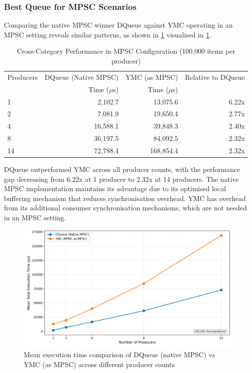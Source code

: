 \subsubsection{Best Queue for \ac{MPSC} Scenarios}
Comparing the native \ac{MPSC} winner DQueue against \ac{YMC} operating in an \ac{MPSC} setting reveals similar patterns, as shown in \cref{tab:best-mpsc} visualised in \cref{fig:cross-mpsc-mean}.

\begin{table}[htb]
\centering
\caption{Cross-Category Performance in \ac{MPSC} Configuration (100,000 items per producer)}
\label{tab:best-mpsc}
\begin{tabular}{@{}lrrr@{}}
\toprule
Producers & DQueue (Native \ac{MPSC}) & \ac{YMC} (as \ac{MPSC}) & Relative to DQueue \\
& Time ($\mu$s) & Time ($\mu$s) & \\
\midrule
1 & 2,102.7 & 13,075.6 & 6.22x \\
2 & 7,081.9 & 19,650.4 & 2.77x \\
4 & 16,588.1 & 39,848.3 & 2.40x \\
8 & 36,197.5 & 84,092.5 & 2.32x \\
14 & 72,788.4 & 168,854.4 & 2.32x \\
\bottomrule
\end{tabular}
\end{table}

DQueue outperformed \ac{YMC} across all producer counts, with the performance gap decreasing from 6.22x at 1 producer to 2.32x at 14 producers. The native \ac{MPSC} implementation maintains its advantage due to its optimised local buffering mechanism that reduces synchronisation overhead. \ac{YMC} has overhead from its additional consumer synchronisation mechanisms, which are not needed in an \ac{MPSC} setting.

\begin{figure}[htb]
\centering
\caption{Mean execution time comparison of DQueue (native MPSC) vs YMC (as MPSC) across different producer counts}
\label{fig:cross-mpsc-mean}
\includegraphics[width=\textwidth]{images/results/best_in_mpsc_mean_performance_vs_producers.png}
\end{figure}

